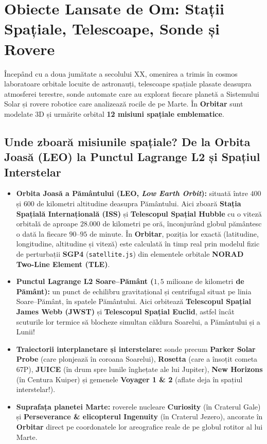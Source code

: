 \chapter{Obiecte Lansate de Om: Stații Spațiale, Telescoape, Sonde și Rovere}
\label{chap:misiuni}

Începând cu a doua jumătate a secolului XX, omenirea a trimis în cosmos laboratoare orbitale locuite de astronauți, telescoape spațiale plasate deasupra atmosferei terestre, sonde automate care au explorat fiecare planetă a Sistemului Solar și rovere robotice care analizează rocile de pe Marte. În \textbf{Orbitar} sunt modelate 3D și urmărite orbital \textbf{12 misiuni spațiale emblematice}.

\section*{Unde zboară misiunile spațiale? De la Orbita Joasă (LEO) la Punctul Lagrange L2 și Spațiul Interstelar}

\begin{itemize}[leftmargin=1.5em, itemsep=3pt]
  \item \textbf{Orbita Joasă a Pământului (LEO, \emph{Low Earth Orbit}):} situată între $400$ și $600$ de kilometri altitudine deasupra Pământului. Aici zboară \textbf{Stația Spațială Internațională (ISS)} și \textbf{Telescopul Spațial Hubble} cu o viteză orbitală de aproape $28.000$ de kilometri pe oră, înconjurând globul pământesc o dată la fiecare $90\text{--}95\text{ de minute}$. În \textbf{Orbitar}, poziția lor exactă (latitudine, longitudine, altitudine și viteză) este calculată în timp real prin modelul fizic de perturbații \textbf{SGP4} (\texttt{satellite.js}) din elementele orbitale \textbf{NORAD Two-Line Element (TLE)}.
  \item \textbf{Punctul Lagrange L2 Soare--Pământ ($1{,}5\text{ milioane de kilometri}$ de Pământ):} un punct de echilibru gravitațional și centrifugal situat pe linia Soare--Pământ, în spatele Pământului. Aici orbitează \textbf{Telescopul Spațial James Webb (JWST)} și \textbf{Telescopul Spațial Euclid}, astfel încât scuturile lor termice să blocheze simultan căldura Soarelui, a Pământului și a Lunii!
  \item \textbf{Traiectorii interplanetare și interstelare:} sonde precum \textbf{Parker Solar Probe} (care plonjează în coroana Soarelui), \textbf{Rosetta} (care a însoțit cometa 67P), \textbf{JUICE} (în drum spre lunile înghețate ale lui Jupiter), \textbf{New Horizons} (în Centura Kuiper) și gemenele \textbf{Voyager 1 \& 2} (aflate deja în spațiul interstelar!).
  \item \textbf{Suprafața planetei Marte:} roverele nucleare \textbf{Curiosity} (în Craterul Gale) și \textbf{Perseverance \& elicopterul Ingenuity} (în Craterul Jezero), ancorate în \textbf{Orbitar} direct pe coordonatele lor areografice reale de pe globul rotitor al lui Marte.
\end{itemize}

